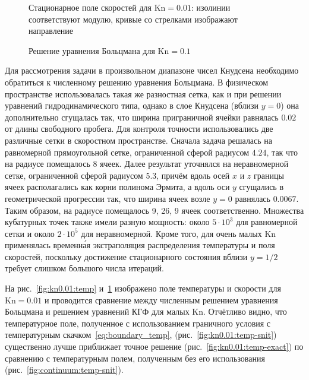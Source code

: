 \documentclass[
aps,%
12pt,%
final,%
notitlepage,%
oneside,%
onecolumn,%
nobibnotes,%
nofootinbib,%
superscriptaddress,%
noshowpacs,%
showkeys,%
centertags]%
{revtex4}
\newcommand{\Kn}{\mathrm{Kn}}
\begin{document}
\begin{figure}
    \centering
    \caption{Стационарное поле скоростей для \(\Kn=0.01\):
        изолинии соответствуют модулю, кривые со стрелками изображают направление}
    \label{fig:kn0.01:flow}
\end{figure}

\begin{figure}
    \centering
    \caption{Решение уравнения Больцмана для \(\Kn=0.1\)}
    \label{fig:kn0.1}
\end{figure}

Для рассмотрения задачи в произвольном диапазоне чисел Кнудсена необходимо
обратиться к численному решению уравнения Больцмана.
В физическом пространстве использовалась такая же разностная сетка,
как и при решении уравнений гидродинамического типа,
однако в слое Кнудсена (вблизи \(y=0\)) она дополнительно сгущалась так,
что ширина приграничной ячейки равнялась \(0.02\) от длины свободного пробега.
Для контроля точности использовались две различные сетки в скоростном пространстве.
Сначала задача решалась на равномерной прямоугольной сетке, ограниченной сферой радиусом \(4.24\),
так что на радиусе помещалось 8 ячеек.
Далее результат уточнялся на неравномерной сетке, ограниченной сферой радиусом \(5.3\),
причём вдоль осей \(x\) и \(z\) границы ячеек располагались как корни полинома Эрмита,
а вдоль оси \(y\) сгущались в геометрической прогрессии так,
что ширина ячеек возле \(y=0\) равнялась \(0.0067\).
Таким образом, на радиусе помещалось 9, 26, 9 ячеек соответственно.
Множества кубатурных точек также имели разную мощность: около \(5\cdot10^3\) для равномерной сетки
и около \(2\cdot10^5\) для неравномерной.
Кроме того, для очень малых \(\Kn\) применялась временн\'{а}я экстраполяция распределения температуры
и поля скоростей, поскольку достижение стационарного состояния вблизи \(y=1/2\)
требует слишком большого числа итераций.

На рис.~\ref{fig:kn0.01:temp} и~\ref{fig:kn0.01:flow} изображено поле температуры и скорости
для \(\Kn=0.01\) и проводится сравнение между численным решением уравнения Больцмана
и решением уравнений КГФ для малых \(\Kn\).
Отчётливо видно, что температурное поле, полученное с использованием
граничного условия с температурным скачком~\eqref{eq:boundary_temp}, (рис.~\ref{fig:kn0.01:temp-snit})
существенно лучше приближает точное решение (рис.~\ref{fig:kn0.01:temp-exact})
по сравнению с температурным полем, полученным без его использования (рис.~\ref{fig:continuum:temp-snit}).
\end{document}
